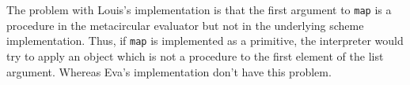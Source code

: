 \documentclass[a4paper,12pt]{article}
\begin{document}
The problem with Louis's implementation is that the first argument to
\lstinline!map! is a procedure in the metacircular evaluator but not
in the underlying scheme implementation.  Thus, if \lstinline!map! is
implemented as a primitive, the interpreter would try to apply an
object which is not a procedure to the first element of the list
argument.  Whereas Eva's implementation don't have this problem.
\end{document}
